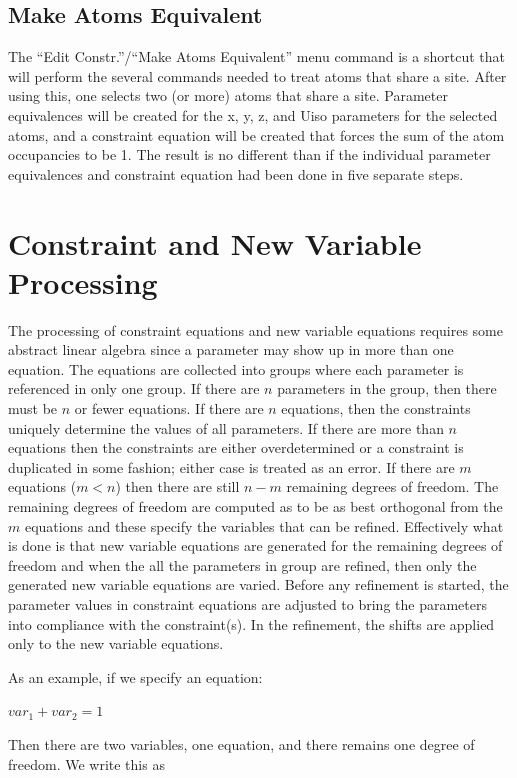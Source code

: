 \subsection{Make Atoms Equivalent}
The ``Edit Constr.''/``Make Atoms Equivalent'' menu command is a shortcut that will perform the several commands needed to treat atoms that share a site. After using this, one selects two (or more) atoms that share a site. Parameter equivalences will be created for the x, y, z, and Uiso parameters for the selected atoms, and a constraint equation will be created that forces the sum of the atom occupancies to be 1. The result is no different than if the individual parameter equivalences and constraint equation had been done in five separate steps. 

\section{Constraint and New Variable Processing}\label{ref:constraintcalc}
The processing of constraint equations and new variable equations requires some abstract linear algebra since a parameter may show up in more than one equation. The equations are collected into groups where each parameter is referenced in only one group. If there are $n$ parameters in the group, then there must be $n$ or fewer equations. If there are $n$ equations, then the constraints uniquely determine the values of all parameters. If there are more than $n$ equations then the constraints are either overdetermined or a constraint is duplicated in some fashion; either case is treated as an error. If there are $m$ equations ($m < n$) then there are still $n-m$ remaining degrees of freedom. The remaining degrees of freedom are computed as to be as best orthogonal from the $m$ equations and these specify the variables that can be refined. Effectively what is done is that new variable equations are generated for the remaining degrees of freedom and when the all the parameters in group are refined, then only the generated new variable equations are varied. Before any refinement is started, the parameter values in constraint equations are adjusted to bring the parameters into compliance with the constraint(s). In the refinement, the shifts are applied only to the new variable equations. 

As an example, if we specify an equation:

    $var_1 + var_2 = 1$

Then there are two variables, one equation, and there remains one degree of freedom. We write this as 

